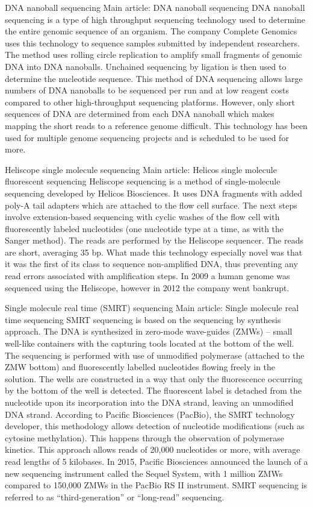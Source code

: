 DNA nanoball sequencing
Main article: DNA nanoball sequencing
DNA nanoball sequencing is a type of high throughput sequencing technology used to determine the entire genomic sequence of an organism. The company Complete Genomics uses this technology to sequence samples submitted by independent researchers. The method uses rolling circle replication to amplify small fragments of genomic DNA into DNA nanoballs. Unchained sequencing by ligation is then used to determine the nucleotide sequence. This method of DNA sequencing allows large numbers of DNA nanoballs to be sequenced per run and at low reagent costs compared to other high-throughput sequencing platforms. However, only short sequences of DNA are determined from each DNA nanoball which makes mapping the short reads to a reference genome difficult. This technology has been used for multiple genome sequencing projects and is scheduled to be used for more.

Heliscope single molecule sequencing
Main article: Helicos single molecule fluorescent sequencing
Heliscope sequencing is a method of single-molecule sequencing developed by Helicos Biosciences. It uses DNA fragments with added poly-A tail adapters which are attached to the flow cell surface. The next steps involve extension-based sequencing with cyclic washes of the flow cell with fluorescently labeled nucleotides (one nucleotide type at a time, as with the Sanger method). The reads are performed by the Heliscope sequencer. The reads are short, averaging 35 bp. What made this technology especially novel was that it was the first of its class to sequence non-amplified DNA, thus preventing any read errors associated with amplification steps. In 2009 a human genome was sequenced using the Heliscope, however in 2012 the company went bankrupt.

Single molecule real time (SMRT) sequencing
Main article: Single molecule real time sequencing
SMRT sequencing is based on the sequencing by synthesis approach. The DNA is synthesized in zero-mode wave-guides (ZMWs) -- small well-like containers with the capturing tools located at the bottom of the well. The sequencing is performed with use of unmodified polymerase (attached to the ZMW bottom) and fluorescently labelled nucleotides flowing freely in the solution. The wells are constructed in a way that only the fluorescence occurring by the bottom of the well is detected. The fluorescent label is detached from the nucleotide upon its incorporation into the DNA strand, leaving an unmodified DNA strand. According to Pacific Biosciences (PacBio), the SMRT technology developer, this methodology allows detection of nucleotide modifications (such as cytosine methylation). This happens through the observation of polymerase kinetics. This approach allows reads of 20,000 nucleotides or more, with average read lengths of 5 kilobases. In 2015, Pacific Biosciences announced the launch of a new sequencing instrument called the Sequel System, with 1 million ZMWs compared to 150,000 ZMWs in the PacBio RS II instrument. SMRT sequencing is referred to as ``third-generation'' or ``long-read'' sequencing.


